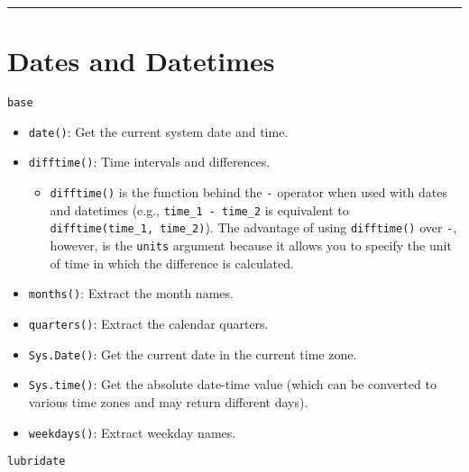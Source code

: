 \documentclass[]{book}
\newenvironment{Shaded}{\begin{snugshade}}{\end{snugshade}}
\newcommand{\KeywordTok}[1]{\textcolor[rgb]{0.13,0.29,0.53}{\textbf{#1}}}
\newcommand{\DataTypeTok}[1]{\textcolor[rgb]{0.13,0.29,0.53}{#1}}
\newcommand{\StringTok}[1]{\textcolor[rgb]{0.31,0.60,0.02}{#1}}
\newcommand{\OperatorTok}[1]{\textcolor[rgb]{0.81,0.36,0.00}{\textbf{#1}}}
\newcommand{\NormalTok}[1]{#1}
\providecommand{\tightlist}{%
  \setlength{\itemsep}{0pt}\setlength{\parskip}{0pt}}
\theoremstyle{definition}
\theoremstyle{definition}
\theoremstyle{definition}
\theoremstyle{remark}
\begin{document}
\begin{Shaded}
\end{Shaded}

\begin{center}\rule{0.5\linewidth}{\linethickness}\end{center}

\section{Dates and Datetimes}\label{dates-and-datetimes-1}

\texttt{base}

\begin{itemize}
\tightlist
\item
  \texttt{date()}: Get the current system date and time.
\item
  \texttt{difftime()}: Time intervals and differences.

  \begin{itemize}
  \tightlist
  \item
    \texttt{difftime()} is the function behind the \texttt{-} operator
    when used with dates and datetimes (e.g.,
    \texttt{time\_1\ -\ time\_2} is equivalent to
    \texttt{difftime(time\_1,\ time\_2)}). The advantage of using
    \texttt{difftime()} over \texttt{-}, however, is the \texttt{units}
    argument because it allows you to specify the unit of time in which
    the difference is calculated.
  \end{itemize}
\item
  \texttt{months()}: Extract the month names.
\item
  \texttt{quarters()}: Extract the calendar quarters.
\item
  \texttt{Sys.Date()}: Get the current date in the current time zone.
\item
  \texttt{Sys.time()}: Get the absolute date-time value (which can be
  converted to various time zones and may return different days).
\item
  \texttt{weekdays()}: Extract weekday names.
\end{itemize}

\texttt{lubridate}
\end{document}
